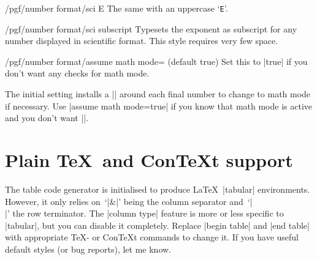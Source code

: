 \begin{key}{/pgf/number format/sci E}
The same with an uppercase `\texttt{E}'.

\begin{codeexample}[]
\end{codeexample}
\end{key}

\begin{key}{/pgf/number format/sci subscript}
Typesets the exponent as subscript for any number displayed in scientific format. This style requires very few space.

\begin{codeexample}[]
\end{codeexample}
\end{key}

\begin{key}{/pgf/number format/assume math mode= (default true)}
	Set this to |true| if you don't want any checks for math mode.
	
	The initial setting installs a |\pgfutilensuremath| around each final number to change to math mode if necessary. Use |assume math mode=true| if you know that math mode is active and you don't want |\pgfutilensuremath|.
\end{key}

\section{Plain \TeX\ and Con\TeX t support}
The table code generator is initialised to produce \LaTeX\ |tabular| environments. However, it only relies on~`|&|' being the column separator and~`|\\|' the row terminator. The |column type| feature is more or less specific to |tabular|, but you can disable it completely. Replace |begin table| and |end table| with appropriate \TeX- or Con\TeX t commands to change it. If you have useful default styles (or bug reports), let me know.

\printindex



